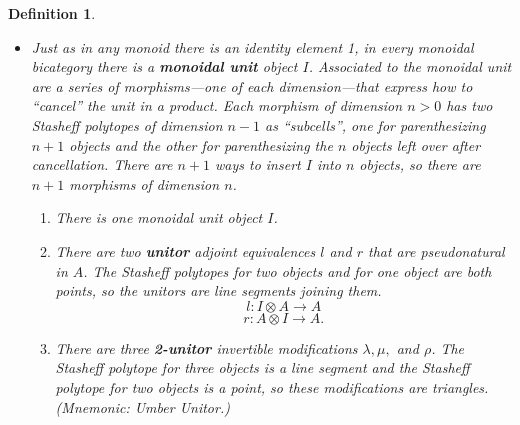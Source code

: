 \documentclass[12pt,twoside,openright]{report}
\newtheorem{defn}{Definition}
\newcommand{\maps}{\colon}
\newcommand{\tensor}{\otimes}
\begin{document}
\begin{defn}
\begin{itemize}
\item Just as in any monoid there is an identity element 1, in every monoidal bicategory there is a {\bf monoidal unit} object $I$. Associated to the monoidal unit are a series of morphisms---one of each dimension---that express how to ``cancel'' the unit in a product. Each morphism of dimension $n>0$ has two Stasheff polytopes of dimension $n-1$ as ``subcells'', one for parenthesizing $n+1$ objects and the other for parenthesizing the $n$ objects left over after cancellation.  There are $n+1$ ways to insert $I$ into $n$ objects, so there are $n+1$ morphisms of dimension $n$.
  \begin{enumerate}
    \item There is one monoidal unit object $I$.
    \item There are two {\bf unitor} adjoint equivalences $l$ and $r$ that are pseudonatural in $A$.  The Stasheff polytopes for two objects and for one object are both points, so the unitors are line segments joining them.
        \[ l\maps I \tensor A \rightarrow A \]
        \[ r\maps A \tensor I \rightarrow A. \]
    \item There are three {\bf 2-unitor} invertible modifications $\lambda, \mu,$ and $\rho$. The Stasheff polytope for three objects is a line segment and the Stasheff polytope for two objects is a point, so these modifications are triangles.  (Mnemonic: Umber Unitor.)
      \begin{center}
      \end{center}
      \begin{center}
\end{center}
\end{enumerate}
\end{itemize}
\end{defn}
\end{document}
